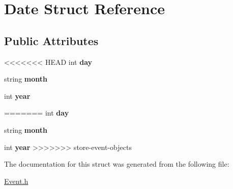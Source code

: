 \hypertarget{struct_date}{}\section{Date Struct Reference}
\label{struct_date}
\subsection*{Public Attributes}
\begin{DoxyCompactItemize}
\item 
<<<<<<< HEAD
int {\bfseries day}\hypertarget{struct_date_a5b192adcabf2b2871e3f0b76c1ec1601}{}\label{struct_date_a5b192adcabf2b2871e3f0b76c1ec1601}

\item 
string {\bfseries month}\hypertarget{struct_date_a90d5c3971e7bcf73d47bdd986964905e}{}\label{struct_date_a90d5c3971e7bcf73d47bdd986964905e}

\item 
int {\bfseries year}\hypertarget{struct_date_a3eeced2ed56bc95d56782b9e738db8ea}{}\label{struct_date_a3eeced2ed56bc95d56782b9e738db8ea}

=======
\hypertarget{struct_date_a5b192adcabf2b2871e3f0b76c1ec1601}{}\label{struct_date_a5b192adcabf2b2871e3f0b76c1ec1601} 
int {\bfseries day}
\item 
\hypertarget{struct_date_a90d5c3971e7bcf73d47bdd986964905e}{}\label{struct_date_a90d5c3971e7bcf73d47bdd986964905e} 
string {\bfseries month}
\item 
\hypertarget{struct_date_a3eeced2ed56bc95d56782b9e738db8ea}{}\label{struct_date_a3eeced2ed56bc95d56782b9e738db8ea} 
int {\bfseries year}
>>>>>>> store-event-objects
\end{DoxyCompactItemize}


The documentation for this struct was generated from the following file\+:\begin{DoxyCompactItemize}
\item 
\hyperlink{_event_8h}{Event.\+h}\end{DoxyCompactItemize}

